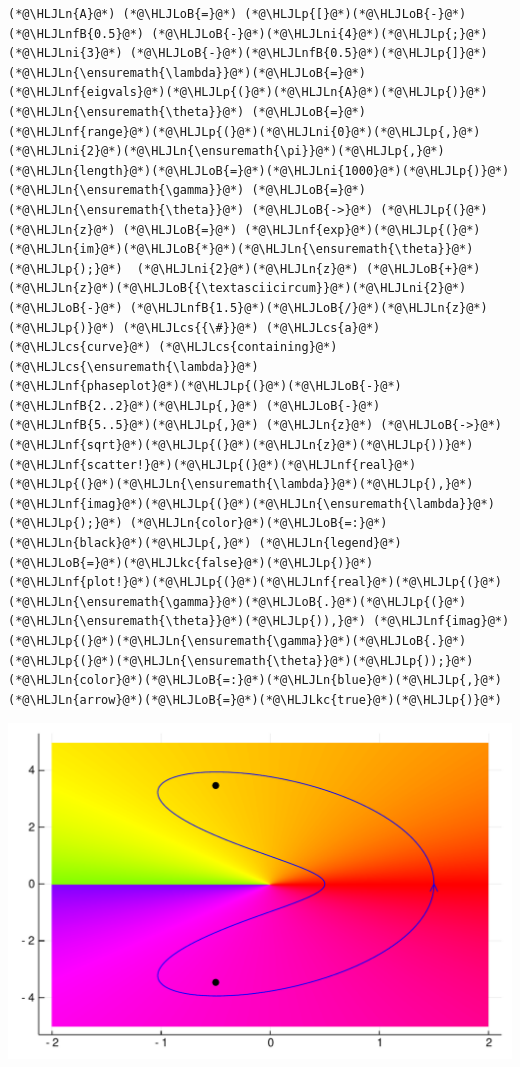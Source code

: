 \documentclass[12pt,a4paper]{article}
\newcommand{\HLJLkc}[1]{\textcolor[RGB]{59,151,46}{\textit{#1}}}
\newcommand{\HLJLn}[1]{#1}
\newcommand{\HLJLnf}[1]{\textcolor[RGB]{66,102,213}{#1}}
\newcommand{\HLJLnfB}[1]{\textcolor[RGB]{59,151,46}{#1}}
\newcommand{\HLJLni}[1]{\textcolor[RGB]{59,151,46}{#1}}
\newcommand{\HLJLoB}[1]{\textcolor[RGB]{102,102,102}{\textbf{#1}}}
\newcommand{\HLJLp}[1]{#1}
\newcommand{\HLJLcs}[1]{\textcolor[RGB]{153,153,119}{\textit{#1}}}
\begin{document}
\begin{lstlisting}
(*@\HLJLn{A}@*) (*@\HLJLoB{=}@*) (*@\HLJLp{[}@*)(*@\HLJLoB{-}@*)(*@\HLJLnfB{0.5}@*) (*@\HLJLoB{-}@*)(*@\HLJLni{4}@*)(*@\HLJLp{;}@*) (*@\HLJLni{3}@*) (*@\HLJLoB{-}@*)(*@\HLJLnfB{0.5}@*)(*@\HLJLp{]}@*)
(*@\HLJLn{\ensuremath{\lambda}}@*)(*@\HLJLoB{=}@*) (*@\HLJLnf{eigvals}@*)(*@\HLJLp{(}@*)(*@\HLJLn{A}@*)(*@\HLJLp{)}@*)
(*@\HLJLn{\ensuremath{\theta}}@*) (*@\HLJLoB{=}@*) (*@\HLJLnf{range}@*)(*@\HLJLp{(}@*)(*@\HLJLni{0}@*)(*@\HLJLp{,}@*)(*@\HLJLni{2}@*)(*@\HLJLn{\ensuremath{\pi}}@*)(*@\HLJLp{,}@*)(*@\HLJLn{length}@*)(*@\HLJLoB{=}@*)(*@\HLJLni{1000}@*)(*@\HLJLp{)}@*)
(*@\HLJLn{\ensuremath{\gamma}}@*) (*@\HLJLoB{=}@*) (*@\HLJLn{\ensuremath{\theta}}@*) (*@\HLJLoB{->}@*) (*@\HLJLp{(}@*)(*@\HLJLn{z}@*) (*@\HLJLoB{=}@*) (*@\HLJLnf{exp}@*)(*@\HLJLp{(}@*)(*@\HLJLn{im}@*)(*@\HLJLoB{*}@*)(*@\HLJLn{\ensuremath{\theta}}@*)(*@\HLJLp{);}@*)  (*@\HLJLni{2}@*)(*@\HLJLn{z}@*) (*@\HLJLoB{+}@*) (*@\HLJLn{z}@*)(*@\HLJLoB{{\textasciicircum}}@*)(*@\HLJLni{2}@*) (*@\HLJLoB{-}@*) (*@\HLJLnfB{1.5}@*)(*@\HLJLoB{/}@*)(*@\HLJLn{z}@*)(*@\HLJLp{)}@*) (*@\HLJLcs{{\#}}@*) (*@\HLJLcs{a}@*) (*@\HLJLcs{curve}@*) (*@\HLJLcs{containing}@*) (*@\HLJLcs{\ensuremath{\lambda}}@*)
(*@\HLJLnf{phaseplot}@*)(*@\HLJLp{(}@*)(*@\HLJLoB{-}@*)(*@\HLJLnfB{2..2}@*)(*@\HLJLp{,}@*) (*@\HLJLoB{-}@*)(*@\HLJLnfB{5..5}@*)(*@\HLJLp{,}@*) (*@\HLJLn{z}@*) (*@\HLJLoB{->}@*) (*@\HLJLnf{sqrt}@*)(*@\HLJLp{(}@*)(*@\HLJLn{z}@*)(*@\HLJLp{))}@*)
(*@\HLJLnf{scatter!}@*)(*@\HLJLp{(}@*)(*@\HLJLnf{real}@*)(*@\HLJLp{(}@*)(*@\HLJLn{\ensuremath{\lambda}}@*)(*@\HLJLp{),}@*)(*@\HLJLnf{imag}@*)(*@\HLJLp{(}@*)(*@\HLJLn{\ensuremath{\lambda}}@*)(*@\HLJLp{);}@*) (*@\HLJLn{color}@*)(*@\HLJLoB{=:}@*)(*@\HLJLn{black}@*)(*@\HLJLp{,}@*) (*@\HLJLn{legend}@*)(*@\HLJLoB{=}@*)(*@\HLJLkc{false}@*)(*@\HLJLp{)}@*)
(*@\HLJLnf{plot!}@*)(*@\HLJLp{(}@*)(*@\HLJLnf{real}@*)(*@\HLJLp{(}@*)(*@\HLJLn{\ensuremath{\gamma}}@*)(*@\HLJLoB{.}@*)(*@\HLJLp{(}@*)(*@\HLJLn{\ensuremath{\theta}}@*)(*@\HLJLp{)),}@*) (*@\HLJLnf{imag}@*)(*@\HLJLp{(}@*)(*@\HLJLn{\ensuremath{\gamma}}@*)(*@\HLJLoB{.}@*)(*@\HLJLp{(}@*)(*@\HLJLn{\ensuremath{\theta}}@*)(*@\HLJLp{));}@*) (*@\HLJLn{color}@*)(*@\HLJLoB{=:}@*)(*@\HLJLn{blue}@*)(*@\HLJLp{,}@*) (*@\HLJLn{arrow}@*)(*@\HLJLoB{=}@*)(*@\HLJLkc{true}@*)(*@\HLJLp{)}@*)
\end{lstlisting}

\includegraphics[width=\linewidth]{figures/Lecture7_5_1.pdf}
\end{document}
